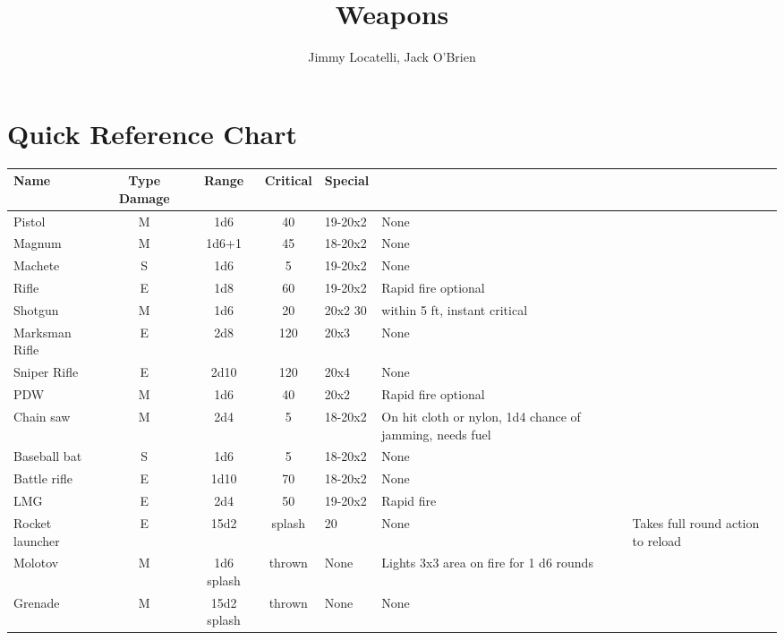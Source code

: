 \documentclass[12pt]{article}
\begin{document}
\title{Weapons}
\author{Jimmy Locatelli, Jack O'Brien}
\maketitle

\section{Quick Reference Chart}

\begin{tabular}{ | l | c | c | c | p{5cm} | }
Name & Type Damage & Range & Critical & Special \\
\hline
Pistol & M & 1d6 & 40 & 19-20x2 & None \\
Magnum & M & 1d6+1 & 45 & 18-20x2 & None \\
Machete & S & 1d6 & 5 & 19-20x2 & None \\
Rifle & E & 1d8 & 60 & 19-20x2 & Rapid fire optional \\
Shotgun & M & 1d6 & 20 & 20x2 30 & within 5 ft, instant critical \\
Marksman Rifle & E & 2d8 & 120 & 20x3 & None \\
Sniper Rifle & E & 2d10 & 120 & 20x4 & None \\
PDW & M & 1d6 & 40 & 20x2 & Rapid fire optional \\
Chain saw & M & 2d4 & 5 & 18-20x2 & On hit cloth or nylon, 1d4 chance of jamming, needs fuel \\
Baseball bat & S & 1d6 & 5 & 18-20x2 & None \\
Battle rifle & E & 1d10 & 70 & 18-20x2 & None \\
LMG & E & 2d4 & 50 & 19-20x2 & Rapid fire \\
Rocket launcher & E & 15d2 & splash & 20 & None & Takes full round action to reload\\
Molotov & M & 1d6 splash & thrown & None & Lights 3x3 area on fire for 1 d6 rounds\\
Grenade & M & 15d2 splash & thrown & None & None\\
\end{tabular}
\end{document}
